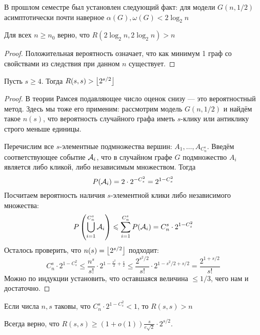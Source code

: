 \begin{reminder}
	В прошлом семестре был установлен следующий факт: для модели $G(n, 1/2)$ асимптотически почти наверное $\alpha(G), \omega(G) < 2\log_2 n$
\end{reminder}

\begin{corollary}
	Для всех $n \ge n_0$ верно, что \(R(2\log_2 n, 2\log_2 n) > n\)
\end{corollary}

\begin{proof}
	Положительная вероятность означает, что как минимум 1 граф со свойствами из следствия при данном $n$ существует.
\end{proof}

\begin{theorem}
	Пусть $s \ge 4$. Тогда $R(s, s) > \left\lfloor 2^{s / 2} \right\rfloor$
\end{theorem}

\begin{proof}
	В теории Рамсея подавляющее число оценок снизу --- это вероятностный метод. Здесь мы тоже его применим: рассмотрим модель $G(n, 1/2)$ и найдём такое $n(s)$, что вероятность случайного графа иметь $s$-клику или антиклику строго меньше единицы.
	
	Перечислим все $s$-элементные подмножества вершин: $A_1, \ldots, A_{C_n^s}$. Введём соответствующее событие $\mathcal{A}_i$, что в случайном графе $G$ подмножество $A_i$ является либо кликой, либо независимым множеством. Тогда
	\[
		P(\mathcal{A}_i) = 2 \cdot 2^{-C_s^2} = 2^{1 - C_s^2}
	\]
	Посчитаем вероятность наличия $s$-элементной клики либо независимого множества:
	\[
		P\left(\bigcup_{i = 1}^{C_n^s} \mathcal{A}_i\right) \leqslant \sum_{i = 1}^{C_n^s} P(\mathcal{A}_i) = C_n^s \cdot 2^{1 - C_s^2}
	\]
	Осталось проверить, что $n(s) = \left\lfloor 2^{s / 2} \right\rfloor$ подходит:
	\[
		C_n^s \cdot 2^{1 - C_s^2} \le \frac{n^s}{s!} \cdot 2^{1 - \frac{s^2}{2} + \frac{s}{2}} \le \frac{2^{s^2 / 2}}{s!} \cdot 2^{1 - s^2 / 2 + s / 2} = \frac{2^{1 + s / 2}}{s!}
	\]
	Можно по индукции установить, что оставшаяся величина $\le 1 / 3$, чего нам и достаточно.
\end{proof}

\begin{corollary}
	Если числа $n, s$ таковы, что $C_n^s \cdot 2^{1 - C_s^2} < 1$, то $R(s, s) > n$
\end{corollary}

\begin{corollary}
	Всегда верно, что $R(s, s) \ge (1 + o(1))\frac{s}{e\sqrt{2}} \cdot 2^{s / 2}$.
\end{corollary}

